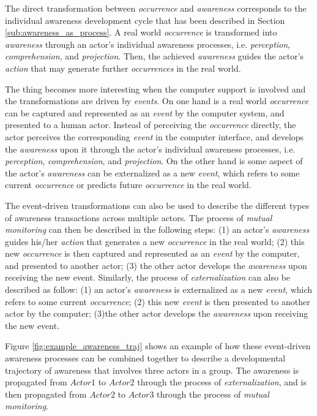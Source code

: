The direct transformation between \emph{occurrence} and \emph{awareness} corresponds to the individual awareness development cycle that has been described in Section \ref{sub:awareness_as_process}. A real world \emph{occurrence} is transformed into \emph{awareness} through an actor's individual awareness processes, i.e. \emph{perception}, \emph{comprehension}, and \emph{projection}. Then, the achieved \emph{awareness} guides the actor's \emph{action} that may generate further \emph{occurrences} in the real world. 

The thing becomes more interesting when the computer support is involved and the transformations are driven by \emph{events}. On one hand is a real world \emph{occurrence} can be captured and represented as an \emph{event} by the computer system, and presented to a human actor. Instead of perceiving the \emph{occurrence} directly, the actor perceives the corresponding \emph{event} in the computer interface, and develops the \emph{awareness} upon it through the actor's individual awareness processes, i.e. \emph{perception}, \emph{comprehension}, and \emph{projection}. On the other hand is some aspect of the actor's \emph{awareness} can be externalized as a new \emph{event}, which refers to some current \emph{occurrence} or predicts future \emph{occurrence} in the real world.

The event-driven transformations can also be used to describe the different types of awareness transactions across multiple actors. The process of \emph{mutual monitoring} can then be described in the following steps: (1) an actor's \emph{awareness} guides his/her \emph{action} that generates a new \emph{occurrence} in the real world; (2) this new \emph{occurrence} is then captured and represented as an \emph{event} by the computer, and presented to another actor; (3) the other actor develops the \emph{awareness} upon receiving the new event. Similarly, the process of \emph{externalization} can also be described as follow: (1) an actor's \emph{awareness} is externalized as a new \emph{event}, which refers to some current \emph{occurrence}; (2) this new \emph{event} is then presented to another actor by the computer; (3)the other actor develops the \emph{awareness} upon receiving the new event. 

Figure \ref{fig:example_awareness_traj} shows an example of how these event-driven awareness processes can be combined together to describe a developmental trajectory of awareness that involves three actors in a group. The awareness is propagated from $Actor1$ to $Actor2$ through the process of \emph{externalization}, and is then propagated from $Actor2$ to $Actor3$ through the process of \emph{mutual monitoring}.

